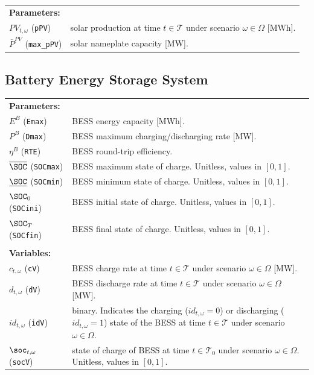\begin{tabularx}{\textwidth}{l X}
    
    \textbf{Parameters:} \\
	$PV_{t, \omega}$ (\texttt{pPV}) & solar production at time $t \in \mathcal{T}$ under scenario $\omega \in \Omega$ [MWh]. \\
	$\overline{P}^{PV}$ (\texttt{max\_pPV}) & solar nameplate capacity [MW]. \\  
\end{tabularx}

\subsection{Battery Energy Storage System}
\label{SEC:BatteryEnergyStorageSystem1}

\begin{tabularx}{\textwidth}{l X}

\textbf{Parameters:} \\
$E^B$ (\texttt{Emax}) & BESS energy capacity [MWh]. \\ 
$P^B$ (\texttt{Dmax}) & BESS maximum charging/discharging rate [MW]. \\ 
$\eta^B$ (\texttt{RTE}) & BESS round-trip efficiency. \\ 
$\overline{\SOC}$ (\texttt{SOCmax}) & BESS maximum state of charge. Unitless, values in $[0, 1]$. \\ 
$\underline{\SOC}$ (\texttt{SOCmin}) & BESS minimum state of charge. Unitless, values in $[0, 1]$. \\ 
$\SOC_0$ (\texttt{SOCini}) & BESS initial state of charge. Unitless, values in $[0, 1]$. \\ 
$\SOC_T$ (\texttt{SOCfin}) & BESS final state of charge. Unitless, values in $[0, 1]$. \\
\\
\textbf{Variables:} \\
$c_{t, \omega}$ (\texttt{cV}) & BESS charge rate at time $t \in \mathcal{T}$ under scenario $\omega \in \Omega$ [MW]. \\ 
$d_{t, \omega}$ (\texttt{dV}) & BESS discharge rate at time $t \in \mathcal{T}$ under scenario $\omega \in \Omega$ [MW]. \\ 
$id_{t, \omega}$ (\texttt{idV}) & binary. Indicates the charging ($id_{t, \omega} = 0$) or discharging ($id_{t, \omega}= 1$) state of the BESS at time $t \in \mathcal{T}$ under scenario $\omega \in \Omega$. \\ 
$\soc_{t, \omega}$ (\texttt{socV}) & state of charge of BESS at time $t \in \mathcal{T}_0$ under scenario $\omega \in \Omega$. Unitless, values in $[0, 1]$. \\
\end{tabularx}

